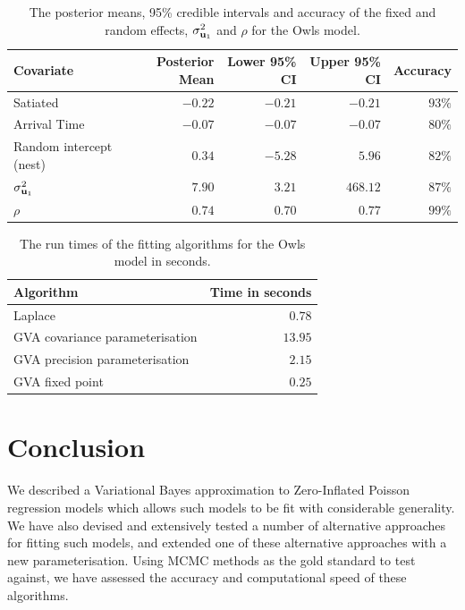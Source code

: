 \begin{table}
	{\footnotesize
	\begin{tabular}{|l|rrrr|}
		\hline
		Covariate          & Posterior Mean & Lower 95\% CI & Upper 95\% CI & Accuracy \\
		\hline
		Satiated & $-0.22$ & $-0.21$ & $-0.21$ & $93\%$ \\
		Arrival Time & $-0.07$ & $-0.07$ & $-0.07$ & $80\%$ \\
		Random intercept (nest) & $0.34$ & $-5.28$ & $5.96$ & $82\%$ \\
		$\sigma_{{\bf u}_1}^2$ & $7.90$ & $3.21$ & $468.12$ & $87\%$ \\
		$\rho$ & $0.74$ & $0.70$ & $0.77$ & $99\%$ \\
		\hline
	\end{tabular}	
}		
	\label{tab:owls_results}\bigskip
	\caption{The posterior means, 95\% credible intervals and accuracy of the fixed and random
						effects, $\sigma_{{\bf u}_1}^2$ and $\rho$ for the Owls model.}
\end{table}

\begin{table}
	{\footnotesize
	\begin{tabular}{|l|r|}
	\hline
	Algorithm & Time in seconds \\
	\hline
	Laplace & $0.78$ \\
	GVA covariance parameterisation & $13.95$ \\
	GVA precision parameterisation & $2.15$ \\
	GVA fixed point & $0.25$ \\
	\hline
	\end{tabular}}\bigskip
	\caption{The run times of the fitting algorithms for the Owls model in seconds.}
	\label{tab:owls_times}
\end{table}


\newpage 

\section{Conclusion} 

We described a Variational Bayes approximation to Zero-Inflated Poisson
regression models which allows such models to be fit with considerable
generality. We have also devised and extensively tested a number of alternative
approaches for fitting such models, and extended one of these alternative
approaches with a new parameterisation. Using MCMC methods as the gold standard
to test against, we have assessed the accuracy and computational speed of these
algorithms.


